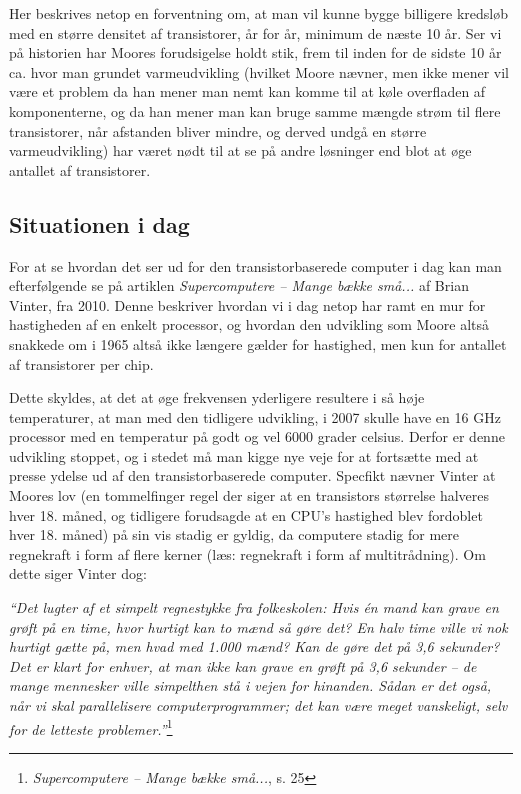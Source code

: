 \documentclass[10pt,a4paper]{article}
\newcommand{\citat}[2]{\begin{justify}\textit{``#1''}\hspace{0.1cm}\footnote{#2}\end{justify}}
\begin{document}
Her beskrives netop en forventning om, at man vil kunne bygge billigere kredsløb med en større densitet af transistorer, år for år, minimum de næste 10 år. Ser vi på historien har Moores forudsigelse holdt stik, frem til inden for de sidste 10 år ca. hvor man grundet varmeudvikling (hvilket Moore nævner, men ikke mener vil være et problem da han mener man nemt kan komme til at køle overfladen af komponenterne, og da han mener man kan bruge samme mængde strøm til flere transistorer, når afstanden bliver mindre, og derved undgå en større varmeudvikling) har været nødt til at se på andre løsninger end blot at øge antallet af transistorer.

\subsection{Situationen i dag}
For at se hvordan det ser ud for den transistorbaserede computer i dag kan man efterfølgende se på artiklen \textit{Supercomputere -- Mange bække små...} af Brian Vinter, fra 2010. Denne beskriver hvordan vi i dag netop har ramt en mur for hastigheden af en enkelt processor, og hvordan den udvikling som Moore altså snakkede om i 1965 altså ikke længere gælder for hastighed, men kun for antallet af transistorer per chip.

Dette skyldes, at det at øge frekvensen yderligere resultere i så høje temperaturer, at man med den tidligere udvikling, i 2007 skulle have en 16 GHz processor med en temperatur på godt og vel 6000 grader celsius. Derfor er denne udvikling stoppet, og i stedet må man kigge nye veje for at fortsætte med at presse ydelse ud af den transistorbaserede computer. Specfikt nævner Vinter at Moores lov (en tommelfinger regel der siger at en transistors størrelse halveres hver 18. måned, og tidligere forudsagde at en CPU's hastighed blev fordoblet hver 18. måned) på sin vis stadig er gyldig, da computere stadig for mere regnekraft i form af flere kerner (læs: regnekraft i form af multitrådning). Om dette siger Vinter dog:
\citat{Det lugter af et simpelt regnestykke fra folkeskolen: Hvis én mand kan grave en grøft på en time, hvor hurtigt kan to mænd så gøre det? En halv time ville vi nok hurtigt gætte på, men hvad med 1.000 mænd? Kan de gøre det på 3,6 sekunder? Det er klart for enhver, at man ikke kan grave en grøft på 3,6 sekunder – de mange mennesker ville simpelthen stå i vejen for hinanden. Sådan er det også, når vi skal parallelisere computerprogrammer; det kan være meget vanskeligt, selv for de letteste problemer.}{\textit{Supercomputere -- Mange bække små...}, s. 25}
\end{document}
